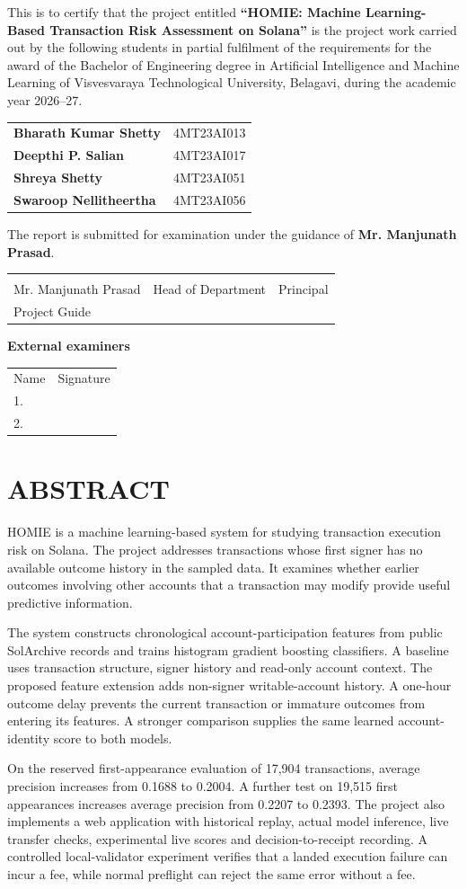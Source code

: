 \documentclass[12pt,a4paper,oneside]{report}
\newcommand{\ProjectTitle}{HOMIE: Machine Learning-Based Transaction Risk Assessment on Solana}
\newcommand{\AcademicYear}{2026--27}
\newcommand{\GuideName}{Mr. Manjunath Prasad}
\newcommand{\AuthorTable}{\begin{tabular}{ll}\textbf{Bharath Kumar Shetty}&4MT23AI013\\\textbf{Deepthi P. Salian}&4MT23AI017\\\textbf{Shreya Shetty}&4MT23AI051\\\textbf{Swaroop Nellitheertha}&4MT23AI056\end{tabular}}
\begin{document}
This is to certify that the project entitled \textbf{``\ProjectTitle''} is the project work carried out by the following students in partial fulfilment of the requirements for the award of the Bachelor of Engineering degree in Artificial Intelligence and Machine Learning of Visvesvaraya Technological University, Belagavi, during the academic year \AcademicYear.
\begin{center}\AuthorTable\end{center}
The report is submitted for examination under the guidance of \textbf{\GuideName}.
\vspace{12mm}
\begin{tabularx}{\textwidth}{YYY}
\hrulefill&\hrulefill&\hrulefill\\
\GuideName&Head of Department&Principal\\
Project Guide&&
\end{tabularx}
\vspace{10mm}\textbf{External examiners}\par
\begin{tabularx}{\textwidth}{Y Y}Name&Signature\\[9mm]1.\ \hrulefill&\hrulefill\\[9mm]2.\ \hrulefill&\hrulefill\end{tabularx}
\clearpage\endgroup
\chapter*{ABSTRACT}
HOMIE is a machine learning-based system for studying transaction execution risk on Solana. The project addresses transactions whose first signer has no available outcome history in the sampled data. It examines whether earlier outcomes involving other accounts that a transaction may modify provide useful predictive information.

The system constructs chronological account-participation features from public SolArchive records and trains histogram gradient boosting classifiers. A baseline uses transaction structure, signer history and read-only account context. The proposed feature extension adds non-signer writable-account history. A one-hour outcome delay prevents the current transaction or immature outcomes from entering its features. A stronger comparison supplies the same learned account-identity score to both models.

On the reserved first-appearance evaluation of 17,904 transactions, average precision increases from 0.1688 to 0.2004. A further test on 19,515 first appearances increases average precision from 0.2207 to 0.2393. The project also implements a web application with historical replay, actual model inference, live transfer checks, experimental live scores and decision-to-receipt recording. A controlled local-validator experiment verifies that a landed execution failure can incur a fee, while normal preflight can reject the same error without a fee.
\end{document}
